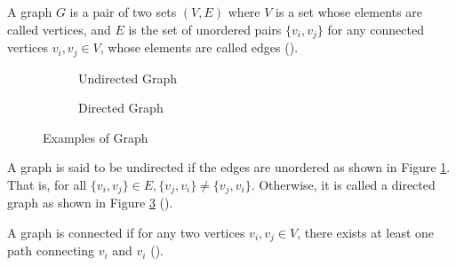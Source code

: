 A graph $G$ is a pair of two sets $(V, E)$ where $V$ is a set whose elements are called vertices, and $E$ is the set of unordered pairs $\{v_i, v_j\}$ for any connected vertices $v_i, v_j \in V$, whose elements are called edges (\cite{diestel2024graph}).

\begin{figure}[htb]
    \centering
    \begin{subfigure}{0.4\textwidth}
        \centering
        \caption{Undirected Graph}
        \label{fig:undirected-graph}
    \end{subfigure}
    \qquad
    \begin{subfigure}{0.4\textwidth}
        \centering
        \caption{Directed Graph}
        \label{fig:directed-graph}
    \end{subfigure}
    \caption{Examples of Graph}
\end{figure}

A graph is said to be undirected if the edges are unordered as shown in Figure \ref{fig:undirected-graph}. That is, for all $\{v_i, v_j\} \in E, \{v_j, v_i\}\neq \{v_j, v_i\}$. Otherwise, it is called a directed graph as shown in Figure \ref{fig:directed-graph} (\cite{diestel2024graph}).

A graph is connected if for any two vertices $v_i, v_j \in V$, there exists at least one path connecting $v_i$ and $v_i$ (\cite{diestel2024graph}).


